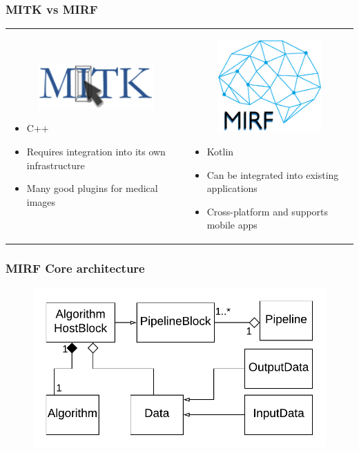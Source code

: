 \documentclass[xetex,mathserif,serif]{beamer}
\begin{document}
 \begin{frame}
     \frametitle{MITK vs MIRF}
     \begin{tabular}{p{5cm} p{6cm}}
        \begin{figure}[b]
             \centering
             \includegraphics[width=4.5cm]{pictures/mitk.png}  
         \end{figure}
         \begin{itemize}
             \item C++
             \item Requires integration into its own infrastructure
             \item Many good plugins  for medical images
         \end{itemize}
         &
         \begin{figure}[b]
             \centering
             \includegraphics[width=4.0cm]{pictures/mirf.png}  
         \end{figure}
         \begin{itemize}
             \item Kotlin
             \item Can be integrated into existing applications
             \item Cross-platform and supports mobile apps
         \end{itemize}
     \end{tabular}
 \end{frame}
 
\begin{frame}
	\frametitle{MIRF Core architecture}
	\begin{figure}[b]
		\centering
		\includegraphics[width=12cm]{pictures/pipe.png}
	\end{figure}
\end{frame}
 
\end{document}
